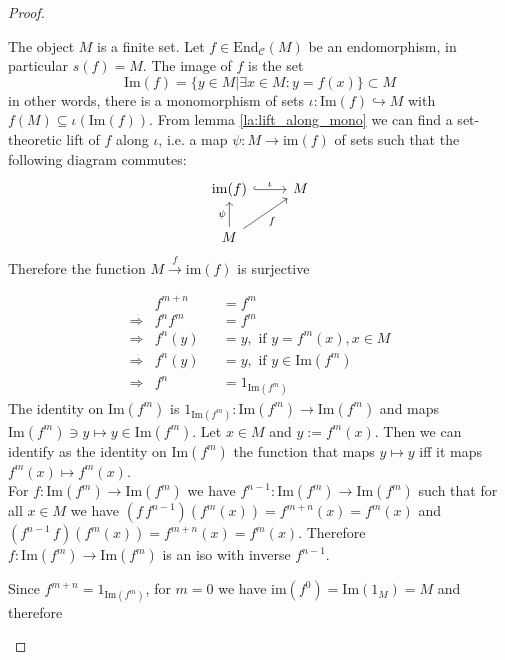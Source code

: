 \begin{proof}[Proof\nopunct]
\begin{subproof}[of (1)]
The object $M$ is a finite set. Let $f \in \mathrm{End}_{\mathcal{C}}(M)$ be an endomorphism, in particular $s(f) = M$. The image of $f$ is the set 
\[
\mathrm{Im}(f) = \{ y \in M | \exists x \in M : y = f(x)\} \subset M
\]
in other words, there is a monomorphism of sets $\iota : \mathrm{Im}(f) \hookrightarrow M$ with $f(M) \subseteq \iota(\mathrm{Im}(f))$.
From lemma \ref{la:lift_along_mono} we can find a set-theoretic lift of $f$ along $\iota$, i.e. a map $\psi : M \rightarrow \mathrm{im}(f)$ of sets
such that the following diagram commutes:
\[
\begin{tikzcd}
\mathrm{im}(f) \arrow[r, "\iota", hook] & M \\
M \arrow[ru, "f"'] \arrow[u, "\psi"]    &  
\end{tikzcd}
\]
Therefore the function $M \xrightarrow{f} \mathrm{im}(f)$ is surjective
\end{subproof}
\begin{subproof}[Proof of (2).]
\begin{align*}
&f^{m+n} &&= f^{m} \\
\Rightarrow &f^{n}f^{m} &&= f^{m} \\
\Rightarrow &f^{n}(y) &&= y, \text{ if } y = f^{m}(x), x \in M \\
\Rightarrow &f^{n}(y) &&= y, \text{ if } y \in \mathrm{Im}(f^{m}) \\
\Rightarrow &f^{n} &&= 1_{\mathrm{Im}(f^{m})}
\end{align*}
The identity on $\mathrm{Im}(f^{m})$ is $1_{\mathrm{Im}(f^{m})} : \mathrm{Im}(f^{m}) \rightarrow \mathrm{Im}(f^{m})$
and maps $\mathrm{Im}(f^{m})\ni y \mapsto y \in \mathrm{Im}(f^{m})$.
Let $x \in M$ and $y := f^{m}(x)$. Then we can identify as the identity on $\mathrm{Im}(f^{m})$ the function
that maps $y \mapsto y$ iff it maps $f^{m}(x) \mapsto f^{m}(x)$.\\
For $f : \mathrm{Im}(f^{m}) \rightarrow \mathrm{Im}(f^{m})$ we have
$f^{n-1} : \mathrm{Im}(f^{m}) \rightarrow \mathrm{Im}(f^{m})$ such that for all
$x \in M$ we have $(f\,f^{n-1})(f^{m}(x)) = f^{m+n}(x) = f^{m}(x)$ and
$(f^{n-1}\,f)(f^{m}(x)) = f^{m+n}(x) = f^{m}(x)$. Therefore $f : \mathrm{Im}(f^{m}) \rightarrow \mathrm{Im}(f^{m})$
is an iso with inverse $f^{n-1}$.
\end{subproof}
\begin{subproof}[Proof of (3).]
Since $f^{m+n} = 1_{\mathrm{Im}(f^{m})}$, for $m = 0$ we have
$\mathrm{im}(f^{0}) = \mathrm{Im}(1_{M}) = M$ and therefore

\end{subproof}
\end{proof}
